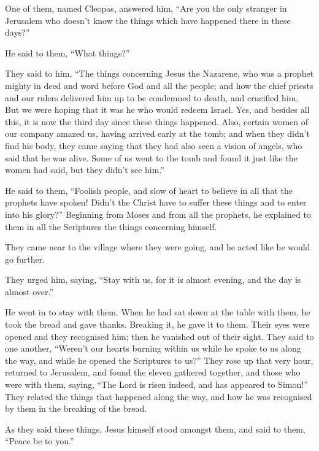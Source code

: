  One of them, named Cleopas, answered him, ``Are you the
only stranger in Jerusalem who doesn't know the things which have
happened there in these days?''

 He said to them, ``What things?''

They said to him, ``The things concerning Jesus the Nazarene, who was a
prophet mighty in deed and word before God and all the people;
 and how the chief priests and our rulers delivered him up
to be condemned to death, and crucified him.  But we were
hoping that it was he who would redeem Israel. Yes, and besides all
this, it is now the third day since these things happened. 
Also, certain women of our company amazed us, having arrived early at
the tomb;  and when they didn't find his body, they came
saying that they had also seen a vision of angels, who said that he was
alive.  Some of us went to the tomb and found it just like
the women had said, but they didn't see him.''

 He said to them, ``Foolish people, and slow of heart to
believe in all that the prophets have spoken!  Didn't the
Christ have to suffer these things and to enter into his glory?''
 Beginning from Moses and from all the prophets, he
explained to them in all the Scriptures the things concerning himself.

 They came near to the village where they were going, and
he acted like he would go further.

 They urged him, saying, ``Stay with us, for it is almost
evening, and the day is almost over.''

He went in to stay with them.  When he had sat down at the
table with them, he took the bread and gave thanks. Breaking it, he gave
it to them.  Their eyes were opened and they recognised
him; then he vanished out of their sight.  They said to one
another, ``Weren't our hearts burning within us while he spoke to us
along the way, and while he opened the Scriptures to us?'' 
They rose up that very hour, returned to Jerusalem, and found the eleven
gathered together, and those who were with them,  saying,
``The Lord is risen indeed, and has appeared to Simon!'' 
They related the things that happened along the way, and how he was
recognised by them in the breaking of the bread.

 As they said these things, Jesus himself stood amongst
them, and said to them, ``Peace be to you.''

